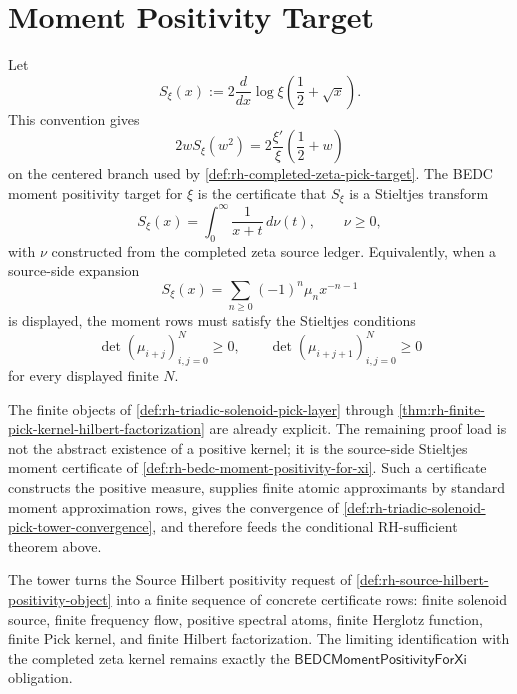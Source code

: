 \section{Moment Positivity Target}
\label{sec:rh-triadic-solenoid-moment-target}

\begin{definition}
\label{def:rh-bedc-moment-positivity-for-xi}
Let
$$
S_{\xi}(x)
:=
2
\frac{d}{dx}
\log\xi\left(\frac12+\sqrt{x}\right).
$$
This convention gives
$$
2wS_{\xi}(w^2)
=
2\frac{\xi'}{\xi}\left(\frac12+w\right)
$$
on the centered branch used by
\autoref{def:rh-completed-zeta-pick-target}.
The BEDC moment positivity target for $\xi$ is the certificate that
$S_{\xi}$ is a Stieltjes transform
$$
S_{\xi}(x)
=
\int_0^\infty\frac{1}{x+t}\,d\nu(t),
\qquad
\nu\ge0,
$$
with $\nu$ constructed from the completed zeta source ledger. Equivalently,
when a source-side expansion
$$
S_{\xi}(x)
=
\sum_{n\ge0}(-1)^n\mu_n x^{-n-1}
$$
is displayed, the moment rows must satisfy the Stieltjes conditions
$$
\det(\mu_{i+j})_{i,j=0}^{N}\ge0,
\qquad
\det(\mu_{i+j+1})_{i,j=0}^{N}\ge0
$$
for every displayed finite $N$.
\end{definition}

\begin{principle}
\label{prin:rh-moment-positivity-remaining-discharge}
The finite objects of
\autoref{def:rh-triadic-solenoid-pick-layer} through
\autoref{thm:rh-finite-pick-kernel-hilbert-factorization} are already
explicit. The remaining proof load is not the abstract existence of a
positive kernel; it is the source-side Stieltjes moment certificate of
\autoref{def:rh-bedc-moment-positivity-for-xi}. Such a certificate
constructs the positive measure, supplies finite atomic approximants by
standard moment approximation rows, gives the convergence of
\autoref{def:rh-triadic-solenoid-pick-tower-convergence}, and therefore
feeds the conditional RH-sufficient theorem above.
\end{principle}

\begin{principle}
\label{prin:rh-triadic-solenoid-pick-tower-status}
The tower turns the Source Hilbert positivity request of
\autoref{def:rh-source-hilbert-positivity-object} into a finite sequence
of concrete certificate rows: finite solenoid source, finite frequency
flow, positive spectral atoms, finite Herglotz function, finite Pick
kernel, and finite Hilbert factorization. The limiting identification
with the completed zeta kernel remains exactly the
$\mathsf{BEDCMomentPositivityForXi}$ obligation.
\end{principle}
